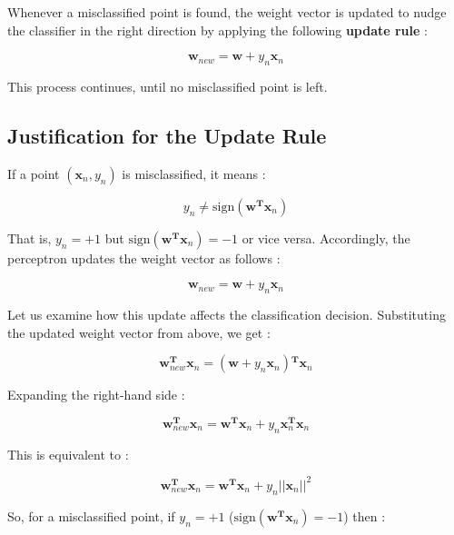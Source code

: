 \documentclass[12pt, letterpaper]{article}
\begin{document}
Whenever a misclassified point is found, the weight vector is updated to nudge the classifier in the right direction by applying the following \textbf{update rule} : 

\begin{displaymath}
    \mathbf{w}_{new} = \mathbf{w} + y_n\mathbf{x}_n
\end{displaymath}

This process continues, until no misclassified point is left.

\subsection{Justification for the Update Rule}
If a point $(\mathbf{x}_n,y_n)$ is misclassified, it means : 

\begin{displaymath}
    y_n \neq \text{sign}(\mathbf{w^T}\mathbf{x}_n)
\end{displaymath}

That is, $y_n = +1$ but $\text{sign}(\mathbf{w^T}\mathbf{x}_n) = -1$ or vice versa. Accordingly, the perceptron updates the weight vector as follows : 

\begin{displaymath}
    \mathbf{w}_{new} = \mathbf{w} + y_n\mathbf{x}_n
\end{displaymath}

Let us examine how this update affects the classification decision. Substituting the updated weight vector from above, we get : 

\begin{displaymath}
    \mathbf{w}_{new}^\mathbf{T}\mathbf{x}_n = (\mathbf{w} + y_n\mathbf{x}_n)\mathbf{^T}\mathbf{x}_n
\end{displaymath}

Expanding the right-hand side : 

\begin{displaymath}
    \mathbf{w}_{new}^\mathbf{T}\mathbf{x}_n = \mathbf{w^T}\mathbf{x}_n + y_n\mathbf{x}_n^\mathbf{T}\mathbf{x}_n
\end{displaymath}

This is equivalent to : 

\begin{displaymath}
    \mathbf{w}_{new}^\mathbf{T}\mathbf{x}_n = \mathbf{w^T}\mathbf{x}_n + y_n||\mathbf{x}_n||^2
\end{displaymath}

So, for a misclassified point, if $y_n = +1$ ($\text{sign}(\mathbf{w^T}\mathbf{x}_n) = -1$) then : 
\end{document}
